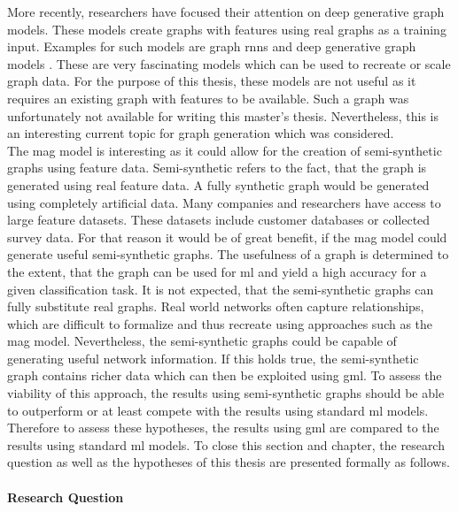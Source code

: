 	\noindent More recently, researchers have focused their attention on deep 
	generative graph models. These models create graphs with features using
	real graphs as a training input. Examples for such models are graph
	\aclp{rnn} \citep{you2018graphrnn} and deep generative graph
	models \citep{li2018learning}. These are very fascinating models which can
	be used to recreate or scale graph data. For the purpose of this thesis,
	these models are not useful as it requires an existing graph with
	features to be available. Such a graph was unfortunately not available for
	writing this master's thesis. Nevertheless, this is an interesting current 
	topic for graph generation which was considered. \\ 

	\noindent The \acs{mag} model is interesting as it could allow for the 
	creation of semi-synthetic graphs using feature data. Semi-synthetic refers
	to the fact, that the graph is generated using real feature data. A fully
	synthetic graph would be generated using completely artificial data. Many
	companies and researchers have access to large feature datasets. These
	datasets include customer databases or collected survey data. For that
	reason it would be of great benefit, if the \acs{mag} model could generate
	useful semi-synthetic graphs. The usefulness of a graph is determined to
	the extent, that the graph can be used for \acs{ml} and yield a high 
	accuracy for a given classification task. It is not expected, that the 
	semi-synthetic graphs can fully substitute real graphs. Real world networks
	often capture relationships, which are difficult to formalize and thus
	recreate using approaches such as the \acs{mag} model. Nevertheless, the
	semi-synthetic graphs could be capable of generating useful network
	information. If this holds true, the semi-synthetic graph contains richer
	data which can then be exploited using \acs{gml}. To assess
	the viability of this approach, the results using semi-synthetic graphs
	should be able to outperform or at least compete with the results using
	standard \acs{ml} models. Therefore to assess these hypotheses, the results 
	using \acs{gml} are compared to the results using standard \acs{ml} models. 
	To close this section and chapter, the research question as well as the 
	hypotheses of this thesis are presented formally as follows.

	\paragraph{Research Question}\mbox{}


